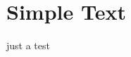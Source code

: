 \documentclass{article}        %
\begin{document}


\section{Simple Text}          %

just a test
\end{document}
